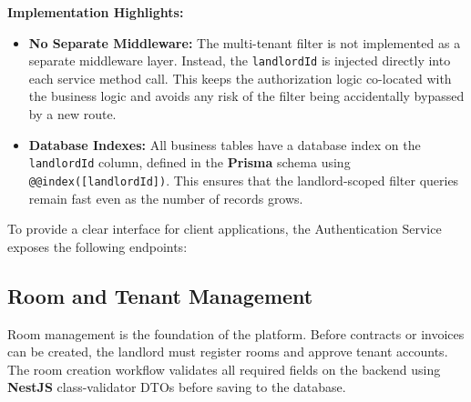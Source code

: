 \textbf{Implementation Highlights:}
\begin{itemize}
    \item \textbf{No Separate Middleware:} The multi-tenant filter is not implemented as a separate middleware layer. Instead, the \texttt{landlordId} is injected directly into each service method call. This keeps the authorization logic co-located with the business logic and avoids any risk of the filter being accidentally bypassed by a new route.
    \item \textbf{Database Indexes:} All business tables have a database index on the \texttt{landlordId} column, defined in the \textbf{Prisma} schema using \texttt{@@index([landlordId])}. This ensures that the landlord-scoped filter queries remain fast even as the number of records grows.
\end{itemize}

To provide a clear interface for client applications, the Authentication Service exposes the following endpoints:

\begin{table}[H]
    \centering
    \caption{Authentication Service API Specification}
    \label{tab:auth_api}
\end{table}

\subsection{Room and Tenant Management}

Room management is the foundation of the platform. Before contracts or invoices can be created, the landlord must register rooms and approve tenant accounts. The room creation workflow validates all required fields on the backend using \textbf{NestJS} class-validator DTOs before saving to the database.


